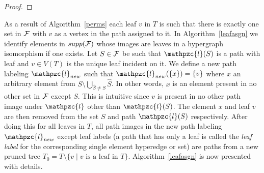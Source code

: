 \documentclass[11pt,
               envcountsect,
               envcountsame]
               {../lib/llncs2e/llncs}
\def\cF{{\cal F}}
\def\hS{{\hat S}}
\def\cl{\mathpzc{l}}
\def\xnoindent{\noindent} %
\newcommand{\set}[1]{\left\{ #1\right\}}
\begin{document}
\begin{proof}
\end{proof}

\xnoindent As a result of Algorithm~\ref{perms} each leaf $v$ in $T$
is such that there is exactly one set in $\cF$ with $v$ as a vertex in
the path assigned to it.  In Algorithm~\ref{leafasgn} we identify
elements in $supp(\cF)$ whose images are leaves in a hypergraph
isomorphism if one exists.  Let $S \in \cF$ be such that $\cl(S)$ is a
path with leaf and $v \in V(T)$ is the unique leaf incident on it.  We
define a new path labeling $\cl_{new}$ such that $\cl_{new}(\set{x}) =
\set{v}$ where $x$ an arbitrary element from $S \setminus \bigcup_{\hS
  \ne S} \hS$. In other words, $x$ is an element present in no other
set in $\cF$ except $S$. This is intuitive since $v$ is present in no
other path image under $\cl$ other than $\cl(S)$.  The element $x$ and
leaf $v$ are then removed from the set $S$ and path $\cl(S)$
respectively. After doing this for all leaves in $T$, all path images
in the new path labeling $\cl_{new}$ except leaf labels (a path that
has only a leaf is called the {\em leaf label} for the corresponding
single element hyperedge or set) are paths from a new pruned tree $T_0
= T \setminus \{v \mid v \text{ is a leaf in }
T\}$. Algorithm~\ref{leafasgn} is now presented with details.
\end{document}
